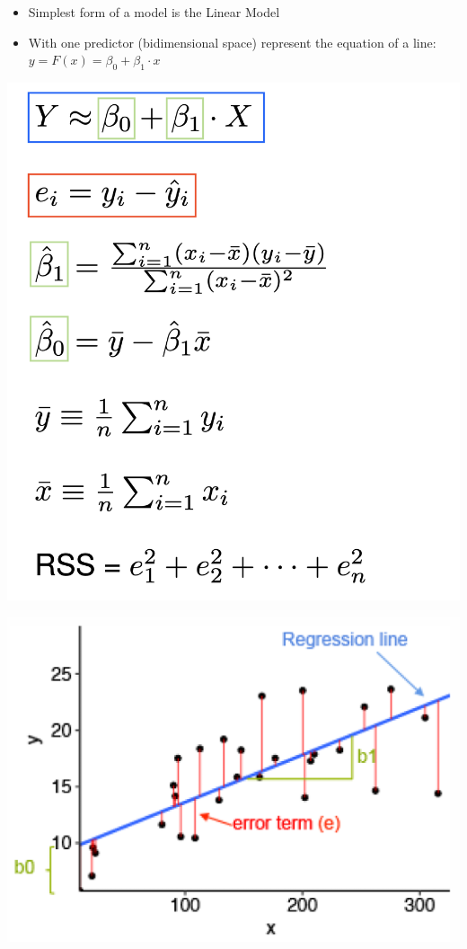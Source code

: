 \documentclass[a4paper]{article}
\begin{document}
			\begin{itemize}
				\item Simplest form of a model is the Linear Model
				\item With one predictor (bidimensional space) represent the equation of a line: \\
					$ y = F(x) = \beta_0 + \beta_1 \cdot x $ \\
			\end{itemize}
		
			\begin{minipage}[c]{0.4\textwidth}
				\centering
				\includegraphics[width=\textwidth]{img/sw08/linear_equations.png}
			\end{minipage}
			\hfill
			\begin{minipage}[c]{0.5\textwidth}
				\centering
				\includegraphics[width=\textwidth]{img/sw08/linear_model.png}
			\end{minipage}
		
\end{document}
